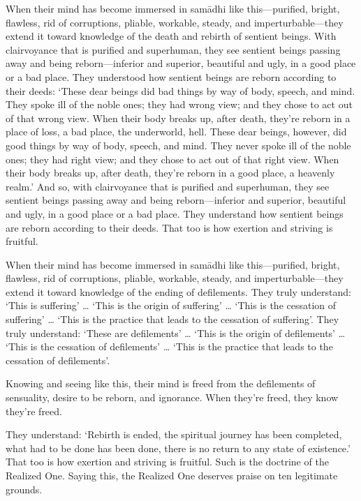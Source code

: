 \documentclass[12pt,openany]{book}%
\begin{document}
When their mind has become immersed in \textsanskrit{samādhi} like this—purified, bright, flawless, rid of corruptions, pliable, workable, steady, and imperturbable—they extend it toward knowledge of the death and rebirth of sentient beings. With clairvoyance that is purified and superhuman, they see sentient beings passing away and being reborn—inferior and superior, beautiful and ugly, in a good place or a bad place. They understood how sentient beings are reborn according to their deeds: ‘These dear beings did bad things by way of body, speech, and mind. They spoke ill of the noble ones; they had wrong view; and they chose to act out of that wrong view. When their body breaks up, after death, they’re reborn in a place of loss, a bad place, the underworld, hell. These dear beings, however, did good things by way of body, speech, and mind. They never spoke ill of the noble ones; they had right view; and they chose to act out of that right view. When their body breaks up, after death, they’re reborn in a good place, a heavenly realm.’ And so, with clairvoyance that is purified and superhuman, they see sentient beings passing away and being reborn—inferior and superior, beautiful and ugly, in a good place or a bad place. They understand how sentient beings are reborn according to their deeds. That too is how exertion and striving is fruitful. 

When their mind has become immersed in \textsanskrit{samādhi} like this—purified, bright, flawless, rid of corruptions, pliable, workable, steady, and imperturbable—they extend it toward knowledge of the ending of defilements. They truly understand: ‘This is suffering’ … ‘This is the origin of suffering’ … ‘This is the cessation of suffering’ … ‘This is the practice that leads to the cessation of suffering’. They truly understand: ‘These are defilements’ … ‘This is the origin of defilements’ … ‘This is the cessation of defilements’ … ‘This is the practice that leads to the cessation of defilements’. 

Knowing and seeing like this, their mind is freed from the defilements of sensuality, desire to be reborn, and ignorance. When they’re freed, they know they’re freed. 

They understand: ‘Rebirth is ended, the spiritual journey has been completed, what had to be done has been done, there is no return to any state of existence.’ That too is how exertion and striving is fruitful. Such is the doctrine of the Realized One. Saying this, the Realized One deserves praise on ten legitimate grounds. 
\end{document}
